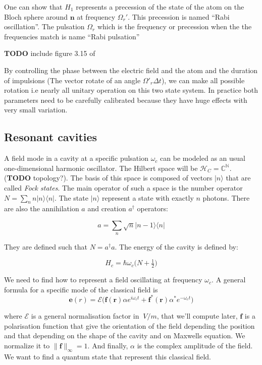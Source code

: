 \documentclass[10pt]{report}
\theoremstyle{plain}
\theoremstyle{definition}
\theoremstyle{remark}
\newcommand{\N}{\ensuremath{\mathbb{N}}}
\newcommand{\C}{\ensuremath{\mathbb{C}}}
\newcommand{\TODO}{\textbf{TODO}}
\newcommand{\ket}[1]{|#1\rangle}
\newcommand{\bra}[1]{\langle#1|}
\newcommand{\bs}{\boldsymbol}
\begin{document}
One can show that $H_1$ represents a precession of the state of the atom on the
Bloch sphere around $\bs n$ at frequency $\Omega_r'$. This precession is named
``Rabi oscillation''. The pulsation $\Omega_r$ which is the frequency or
precession when the the frequencies match is name ``Rabi pulsation''

\TODO{} include figure 3.15 of~\cite{Har06}

By controlling the phase between the electric field and the atom and the
duration of impulsions (The vector rotate of an angle $\Omega'_r\Delta t$), we
can make all possible rotation i.e nearly all unitary operation on this two
state system. In practice both parameters need to be carefully calibrated
because they have huge effects with very small variation.

\subsection{Resonant cavities}\label{ssec:rescav}


A field mode in a cavity at a specific pulsation $\omega_c$ can be modeled
as an usual one-dimensional harmonic oscillator. The Hilbert space will be
$\mathcal{H}_C = \C^\N$. (\TODO{} topology?). The basis of this space is composed of vectors $\ket n$
that are called \emph{Fock states}. The main operator of such a space is the
number operator $N = \sum_n n\ket n \bra n$. The state $\ket n$ represent a
state with exactly $n$ photons. There are also the annihilation $a$ and creation $a^\dagger$ operators:

\[a = \sum_n \sqrt{n} \ket {n-1} \bra{n}\]

They are defined such that $N = a^\dagger a$. The energy of the cavity is
defined by:

\[H_c = \hbar \omega_c \big(N + \tfrac 12\big)\]

We need to find how to represent a field oscillating at frequency $\omega_c$.
A general formula for a specific mode of the classical field is
\[\bs e(r) = \mathcal{E}\big(\bs f(\bs r) \alpha e^{i\omega_c t} + \bs f^*(\bs r)
  \alpha^* e^{-\omega_c t}\big)\]

where $\mathcal{E}$ is a general normalisation factor in $\SI{}{V/m}$, that
we'll compute later, $\bs f$
is a polarisation function that give the orientation of the field depending the
position and that depending on the shape of the cavity and on Maxwells equation.
We normalize it to $\|\bs f\|_\infty = 1$. And finally, $\alpha$ is the complex amplitude
of the field. We want to find a quantum state that represent this classical
field.
\end{document}

